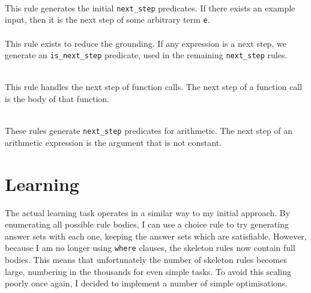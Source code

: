  
\mbox{} \\
This rule generates the initial \lstinline{next_step} predicates. If there exists an example input, then it is the next step of some arbitrary term \lstinline{e}. \\

 
\mbox{} \\
This rule exists to reduce the grounding. If any expression is a next step, we generate an \lstinline{is_next_step} predicate, used in the remaining \lstinline{next_step} rules.

 
\mbox{} \\
This rule handles the next step of function calls. The next step of a function call is the body of that function.

 
\mbox{} \\
These rules generate \lstinline{next_step} predicates for arithmetic. The next step of an arithmetic expression is the argument that is not constant. %

\section{Learning}
The actual learning task operates in a similar way to my initial approach. By enumerating all possible rule bodies, I can use a choice rule to try generating answer sets with each one, keeping the answer sets which are satisfiable. However, because I am no longer using \lstinline{where} clauses, the skeleton rules now contain full bodies. This means that unfortunately the number of skeleton rules becomes large, numbering in the thousands for even simple tasks. To avoid this scaling poorly once again, I decided to implement a number of simple optimisations.%

